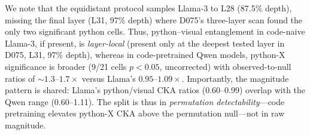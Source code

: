We note that the equidistant protocol samples Llama-3 to L28 (87.5\% depth), missing the final layer (L31, 97\% depth) where D075's three-layer scan found the only two significant python cells.
Thus, python--visual entanglement in code-naive Llama-3, if present, is \emph{layer-local} (present only at the deepest tested layer in D075, L31, 97\% depth), whereas in code-pretrained Qwen models, python-X significance is broader (9/21 cells $p<0.05$, uncorrected) with observed-to-null ratios of ${\sim}1.3$--$1.7\times$ versus Llama's $0.95$--$1.09\times$.
Importantly, the magnitude pattern is shared: Llama's python/visual CKA ratios (0.60--0.99) overlap with the Qwen range (0.60--1.11).
The split is thus in \emph{permutation detectability}---code pretraining elevates python-X CKA above the permutation null---not in raw magnitude.
